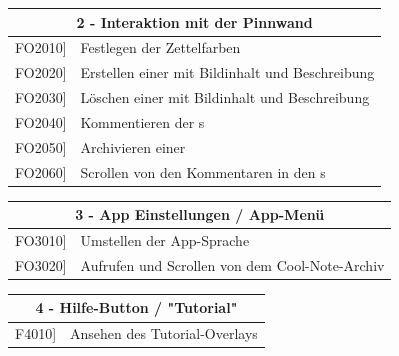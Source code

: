 \documentclass[a4paper]{scrreprt}
\begin{document}
	    \vspace{5mm}
	    
	    \begin{table}[h!]
	    	\centering
	    	\label{my-label}
	    	\begin{tabular}{p{2cm}p{12cm}}
	    		
	    		\multicolumn{2}{c}{\textbf{2 - Interaktion mit der Pinnwand}} \\ \hline
	    		\centering{[}FO2010{]} & Festlegen der Zettelfarben\\
	    		\centering{[}FO2020{]}& Erstellen einer  mit Bildinhalt und Beschreibung                              \\
	    		\centering{[}FO2030{]}& Löschen einer  mit Bildinhalt und Beschreibung\\ 
	    		\centering{[}FO2040{]}& Kommentieren der s\\ 
	    		\centering{[}FO2050{]}& Archivieren einer \\ 
	    		\centering{[}FO2060{]}& Scrollen von den Kommentaren in den s\\ 
	    		\hline
	    	\end{tabular}
	    \end{table}
	    
	    \vspace{5mm}
	    
	    \begin{table}[h!]
	    	\centering
	    	\label{my-label}
	    	\begin{tabular}{p{2cm}p{12cm}}
	    		
	    		\multicolumn{2}{c}{\textbf{3 - App Einstellungen / App-Menü}} \\ \hline
	    		\centering{[}FO3010{]} & Umstellen der App-Sprache\\
	    		\centering{[}FO3020{]} & Aufrufen und Scrollen von dem Cool-Note-Archiv\\
	    		\hline
	    	\end{tabular}
	    \end{table}
	    
	    \vspace{5mm}
	    
	    \begin{table}[h!]
	    	\centering
	    	\label{my-label}
	    	\begin{tabular}{p{2cm}p{12cm}}
	    		
	    		\multicolumn{2}{c}{\textbf{4 - Hilfe-Button / "Tutorial"}} \\ \hline
	    		\centering{[}F4010{]} & Ansehen des Tutorial-Overlays\\    				
	    		\hline
	    	\end{tabular}
	    \end{table}
	    
\end{document}
